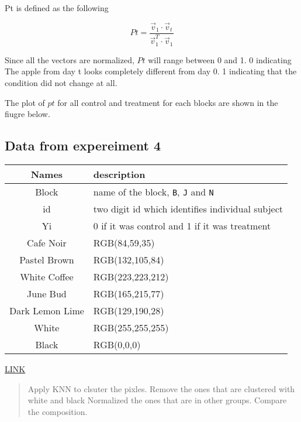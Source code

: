\documentclass[
]{article}
\begin{document}
Pt is defined as the following

\[Pt = \frac{\vec{v}_1 \cdot \vec{v}_t}{\vec{v}_1^T \cdot \vec{v}_1}\]

Since all the vectors are normalized, \(Pt\) will range between 0 and 1.
0 indicating The apple from day t looks completely different from day 0.
1 indicating that the condition did not change at all.

The plot of \(pt\) for all control and treatment for each blocks are
shown in the fiugre below.

\hypertarget{data-from-expereiment-4-1}{%
\subsection{Data from expereiment 4}\label{data-from-expereiment-4-1}}

\begin{longtable}[]{@{}cl@{}}
\toprule
Names & description\tabularnewline
\midrule
\endhead
Block & name of the block, \texttt{B}, \texttt{J} and
\texttt{N}\tabularnewline
id & two digit id which identifies individual subject\tabularnewline
Yi & 0 if it was control and 1 if it was treatment\tabularnewline
Cafe Noir & RGB(84,59,35)\tabularnewline
Pastel Brown & RGB(132,105,84)\tabularnewline
White Coffee & RGB(223,223,212)\tabularnewline
June Bud & RGB(165,215,77)\tabularnewline
Dark Lemon Lime & RGB(129,190,28)\tabularnewline
White & RGB(255,255,255)\tabularnewline
Black & RGB(0,0,0)\tabularnewline
\bottomrule
\end{longtable}

\href{https://www.schemecolor.com/green-with-brown-color-combination.php}{LINK}

\begin{quote}
Apply KNN to clsuter the pixles. Remove the ones that are clustered with
white and black Normalized the ones that are in other groups. Compare
the composition.
\end{quote}
\end{document}
